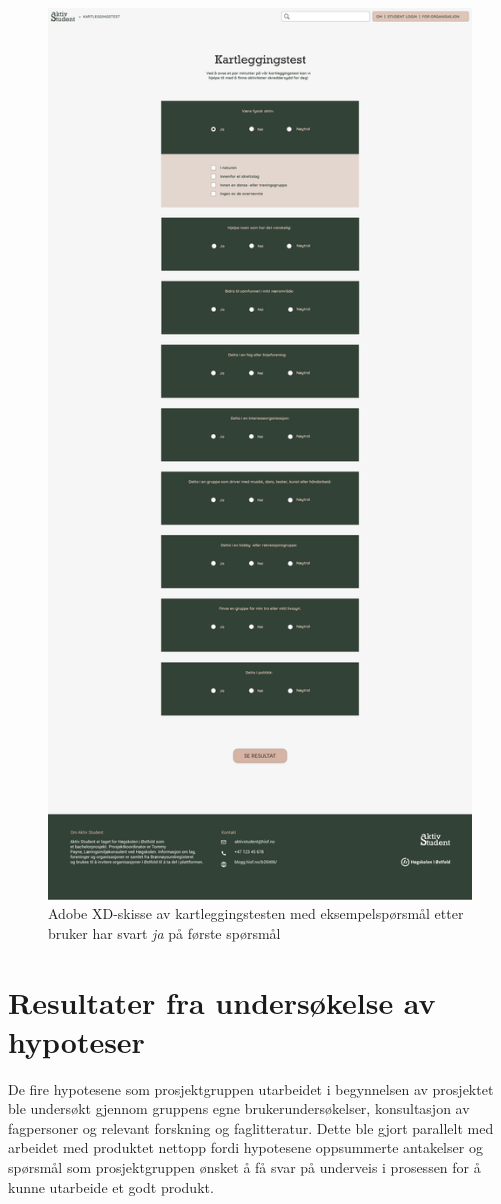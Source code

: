 \begin{figure}[H]
\centering
\includegraphics[width=.6\textwidth]{Illustrasjoner/Skisser-pdf/3.0/3-13-kartleggingstest-ved-svart-ja.pdf}
\caption{Adobe XD-skisse av kartleggingstesten med eksempelspørsmål etter bruker har svart {\em ja} på første spørsmål}
\label{fig:3-13-kartlegging-svart-ja}
\end{figure}

\section{Resultater fra undersøkelse av hypoteser}

De fire hypotesene som prosjektgruppen utarbeidet i begynnelsen av prosjektet ble undersøkt gjennom gruppens egne brukerundersøkelser, konsultasjon av fagpersoner og relevant forskning og faglitteratur. Dette ble gjort parallelt med arbeidet med produktet nettopp fordi hypotesene oppsummerte antakelser og spørsmål som prosjektgruppen ønsket å få svar på underveis i prosessen for å kunne utarbeide et godt produkt.

